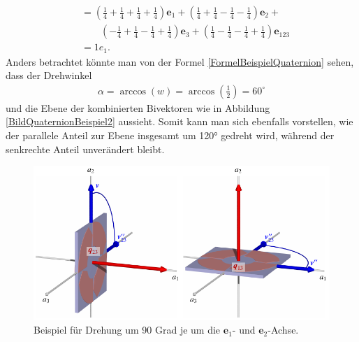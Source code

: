 \begin{beispiel}
\begin{align}
	&= (\textstyle{\frac{1}{4}} + \textstyle{\frac{1}{4}} + \textstyle{\frac{1}{4}} + \textstyle{\frac{1}{4}})\mathbf{e}_1 + (\textstyle{\frac{1}{4}} + \textstyle{\frac{1}{4}} - \textstyle{\frac{1}{4}} - \textstyle{\frac{1}{4}})\mathbf{e}_2 +\\ &\qquad(-\textstyle{\frac{1}{4}} + \textstyle{\frac{1}{4}} - \textstyle{\frac{1}{4}} + \textstyle{\frac{1}{4}})\mathbf{e}_3 + (\textstyle{\frac{1}{4}} - \textstyle{\frac{1}{4}} - \textstyle{\frac{1}{4}} + \textstyle{\frac{1}{4}})\mathbf{e}_{123}\\
	&= 1e_1. 
	\end{align}
	Anders betrachtet könnte man von der Formel \eqref{FormelBeispielQuaternion} sehen, dass der Drehwinkel
	\begin{align}
	\alpha = \arccos(w) = \arccos(\textstyle{\frac{1}{2}}) = 60^\circ
	\end{align}
	und die Ebene der kombinierten Bivektoren wie in Abbildung \ref{BildQuaternionBeispiel2} aussieht.
	Somit kann man sich ebenfalls vorstellen, wie der parallele Anteil zur Ebene insgesamt um 120° gedreht wird, während der senkrechte Anteil unverändert bleibt.
\end{beispiel}

\begin{figure}
	\centering
	\includegraphics{papers/clifford/3d/qq.pdf}
	
	\caption{Beispiel für Drehung um 90 Grad je um die $\mathbf{e}_1$- und $\mathbf{e}_2$-Achse.}
	\label{BildQuaternionBeispiel}
\end{figure}

